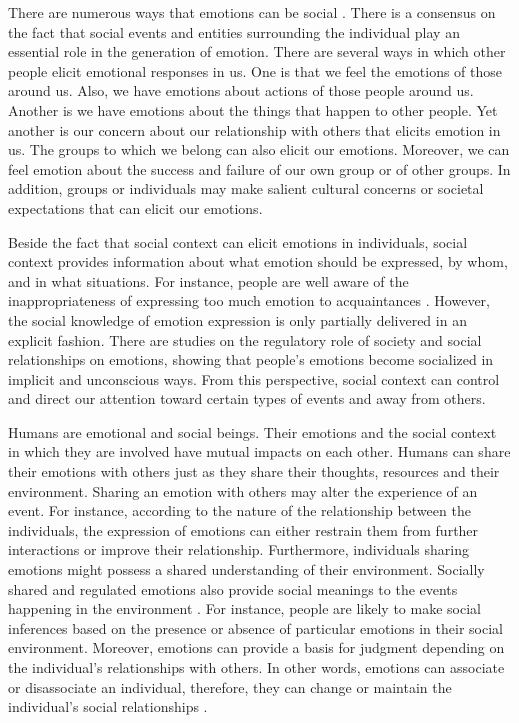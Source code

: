 \documentclass[12pt]{report}
\begin{document}
There are numerous ways that emotions can be social \cite{tiedens:social-life}.
There is a consensus on the fact that social events and entities surrounding the
individual play an essential role in the generation of emotion. There are
several ways in which other people elicit emotional responses in us. One is that
we feel the emotions of those around us. Also, we have emotions about actions of
those people around us. Another is we have emotions about the things that happen
to other people. Yet another is our concern about our relationship with others
that elicits emotion in us. The groups to which we belong can also elicit our
emotions. Moreover, we can feel emotion about the success and failure of our own
group or of other groups. In addition, groups or individuals may make salient
cultural concerns or societal expectations that can elicit our emotions.

Beside the fact that social context can elicit emotions in individuals, social
context provides information about what emotion should be expressed, by whom,
and in what situations. For instance, people are well aware of the
inappropriateness of expressing too much emotion to acquaintances
\cite{tiedens:social-life}. However, the social knowledge of emotion expression
is only partially delivered in an explicit fashion. There are studies on the
regulatory role of society and social relationships on emotions, showing that
people's emotions become socialized in implicit and unconscious ways. From this
perspective, social context can control and direct our attention toward certain
types of events and away from others.

Humans are emotional and social beings. Their emotions and the social context
in which they are involved have mutual impacts on each other. Humans can share
their emotions with others just as they share their thoughts, resources and
their environment. Sharing an emotion with others may alter the experience of an
event. For instance, according to the nature of the relationship between the
individuals, the expression of emotions can either restrain them from further
interactions or improve their relationship. Furthermore, individuals sharing
emotions might possess a shared understanding of their environment. Socially
shared and regulated emotions also provide social meanings to the events
happening in the environment \cite{wisecup:sociology-emotions}. For instance,
people are likely to make social inferences based on the presence or absence of
particular emotions in their social environment. Moreover, emotions can provide
a basis for judgment depending on the individual's relationships with others. In
other words, emotions can associate or disassociate an individual, therefore,
they can change or maintain the individual's social relationships
\cite{tiedens:social-life}.
\end{document}
